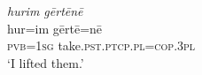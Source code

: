 \ea \label{ŽE.66}
\textit{hurim gērtēnē} \\ 
\gll hur=im gērtē=nē \\ 
 \textsc{pvb}\textsc{=\textsc{1sg}} take\textsc{.pst}\textsc{.ptcp}\textsc{.pl}\textsc{=cop}\textsc{.3pl} \\ 
\glt `I lifted them.'
\z 
 
